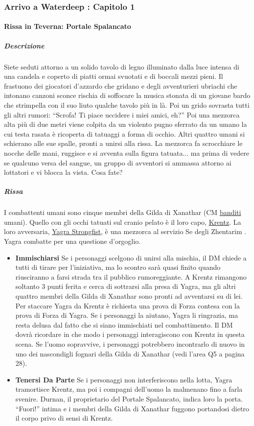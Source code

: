 \documentclass{article}
\begin{document}
\subsubsection{Arrivo a Waterdeep : Capitolo 1}

\paragraph{Rissa in Teverna: Portale Spalancato}
\subparagraph{Descrizione}Siete seduti attorno a un solido tavolo di legno illuminato
dalla luce intensa di una candela e coperto di piatti
ormai svuotati e di boccali mezzi pieni. Il frastuono
dei giocatori d'azzardo che gridano e degli avventurieri
ubriachi che intonano canzoni sconce rischia di soffocare
la musica stonata di un giovane bardo che strimpella con
il suo liuto qualche tavolo più in là.
Poi un grido sovrasta tutti gli altri rumori: “Scrofa! Ti
piace uccidere i miei amici, eh?” Poi una mezzorca alta più
di due metri viene colpita da un violento pugno sferrato
da un umano la cui testa rasata è ricoperta di tatuaggi
a forma di occhio. Altri quattro umani si schierano alle
sue spalle, pronti a unirsi alla rissa. La mezzorca fa
scrocchiare le nocche delle mani, ruggisce e si avventa
sulla figura tatuata... ma prima di vedere se qualcuno
versa del sangue, un gruppo di avventori si ammassa
attorno ai lottatori e vi blocca la vista. Cosa fate?

\subparagraph{Rissa}I combattenti umani sono cinque membri della Gilda
di Xanathar (CM \hyperlink{banditi}{banditi} umani). Quello con gli occhi
tatuati sul cranio pelato è il loro capo, \hyperlink{krent}{ Krentz}. La loro
avversaria, \hyperlink{yagra}{Yagra Strongfist}, è una mezzorca al servizio Se
degli Zhentarim . Yagra combatte per una
questione d'orgoglio.

\begin{itemize}
    \item \textbf{Immischiarsi} Se i personaggi scelgono di unirsi alla mischia, il DM
chiede a tutti di tirare per l'iniziativa, ma lo scontro sarà
quasi finito quando riusciranno a farsi strada tra il pubblico
rumoreggiante. A Krentz rimangono soltanto 3 punti ferita
e cerca di sottrarsi alla presa di Yagra, ma gli altri quattro
membri della Gilda di Xanathar sono pronti ad avventarsi
su di lei.
Per staccare Yagra da Krentz è richiesta una prova
di Forza contesa con la prova di Forza di Yagra. Se i
personaggi la aiutano, Yagra li ringrazia, ma resta delusa
dal fatto che si siano immischiati nel combattimento.
Il DM dovrà ricordare in che modo i personaggi
interagiscono con Krentz in questa scena. Se l’uomo
sopravvive, i personaggi potrebbero incontrarlo di nuovo
in uno dei nascondigli fognari della Gilda di Xanathar (vedi
l’area Q5 a pagina 28).
\item \textbf{Tenersi Da Parte} Se i personaggi non interferiscono nella lotta, Yagra
tramortisce Krentz, ma poi i compagni dell’uomo la
malmenano fino a farla svenire. Durnan, il proprietario del
Portale Spalancato, indica loro la porta. “Fuori!” intima e i
membri della Gilda di Xanathar fuggono portandosi dietro
il corpo privo di sensi di Krentz.

\end{itemize}
\end{document}
